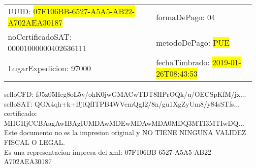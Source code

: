 \documentclass{article}
\begin{document}
\begin{tabular}{p{11cm}p{1cm}p{8cm}}
\bigskip
UUID: \colorbox{yellow}{ 07F106BB-6527-A5A5-AB22-A702AEA30187 } & & formaDePago: 04\\

noCertificadoSAT: 00001000000402636111 & & metodoDePago: \colorbox{yellow}{ PUE }\\

LugarExpedicion: 97000 & & fechaTimbrado: \colorbox{yellow}{ 2019-01-26T08:43:53 } \\
\end{tabular}

\bigskip
selloCFD: fJ5z05Hcg8oL5v/ohK0jwGMACwTDT8HPrOQk/u/OECSpKfM/jx... \\
selloSAT: QGX4qh+k+BjlQfITPB4WVemQgI2/8n/gu1XgZyUm8/y84sSTfs... \\

certificado: MIIGHjCCBAagAwIBAgIUMDAwMDEwMDAwMDA0MDQ3MTI3MTIwDQ...\bigskip\bigskip\bigskip\bigskip\bigskip\bigskip
\\Este documento no es la impresion original y NO TIENE NINGUNA VALIDEZ FISCAL O LEGAL. \\
 Es una representacion impresa del xml:  07F106BB-6527-A5A5-AB22-A702AEA30187 \\
\end{document}
